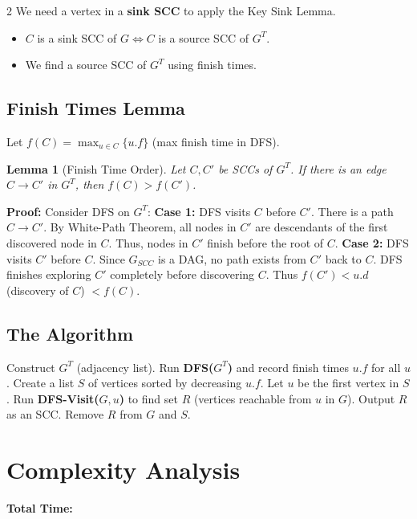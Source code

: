 \documentclass[a4paper,10pt]{article}
\newtheorem*{lemma}{Lemma}
\begin{document}
\begin{multicols}{2}
We need a vertex in a \textbf{sink SCC} to apply the Key Sink Lemma.
\begin{itemize}
    \item $C$ is a sink SCC of $G \iff C$ is a source SCC of $G^T$.
    \item We find a source SCC of $G^T$ using finish times.
\end{itemize}

\subsection{Finish Times Lemma}
Let $f(C) = \max_{u \in C} \{u.f\}$ (max finish time in DFS).
\begin{lemma}[Finish Time Order]
Let $C, C'$ be SCCs of $G^T$. If there is an edge $C \to C'$ in $G^T$, then $f(C) > f(C')$.
\end{lemma}
\textbf{Proof:} Consider DFS on $G^T$:
\textbf{Case 1:} DFS visits $C$ before $C'$.
There is a path $C \to C'$. By White-Path Theorem, all nodes in $C'$ are descendants of the first discovered node in $C$. Thus, nodes in $C'$ finish before the root of $C$.
\textbf{Case 2:} DFS visits $C'$ before $C$.
Since $G_{SCC}$ is a DAG, no path exists from $C'$ back to $C$. DFS finishes exploring $C'$ completely before discovering $C$. Thus $f(C') < u.d$ (discovery of $C$) $< f(C)$.

\subsection{The Algorithm}
\begin{algorithm}[H]
\caption{Find SCCs in Linear Time}
\begin{algorithmic}[1]
\STATE Construct $G^T$ (adjacency list).
\STATE Run \textbf{DFS($G^T$)} and record finish times $u.f$ for all $u$.
\STATE Create a list $S$ of vertices sorted by decreasing $u.f$.
    \STATE Let $u$ be the first vertex in $S$.
    \STATE Run \textbf{DFS-Visit($G, u$)} to find set $R$ (vertices reachable from $u$ in $G$).
    \STATE Output $R$ as an SCC.
    \STATE Remove $R$ from $G$ and $S$.
\ENDWHILE
\end{algorithmic}
\end{algorithm}

\section{Complexity Analysis}

\textbf{Total Time:} 


\end{multicols}
\end{document}
